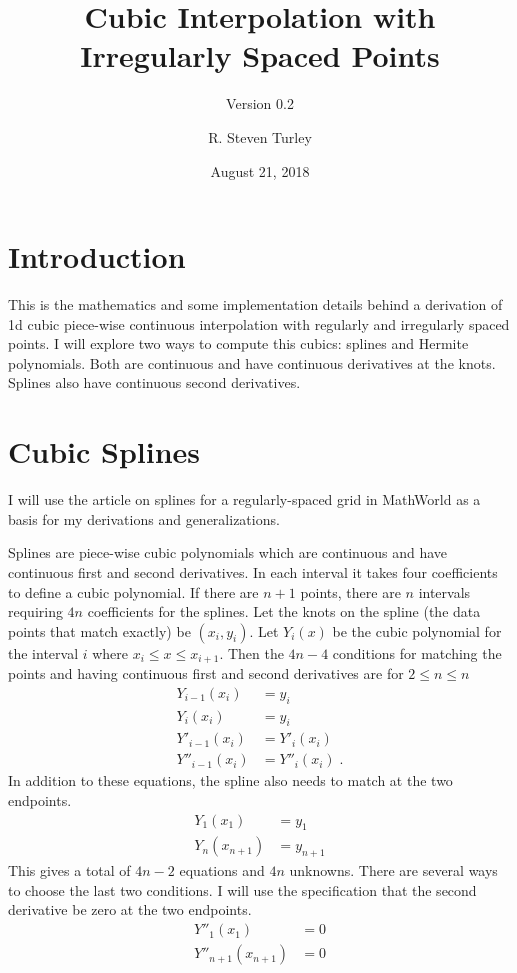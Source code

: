 \documentclass{scrartcl}
\title{Cubic Interpolation with Irregularly Spaced Points}
\subtitle{Version 0.2}
\author{R. Steven Turley}
\date{August 21, 2018}
\begin{document}
\maketitle
\tableofcontents

\section{Introduction}
This is the mathematics and some implementation details
behind a derivation of 1d cubic piece-wise continuous
interpolation with regularly and irregularly spaced points.
I will explore two ways to compute this cubics: splines and
Hermite polynomials. Both are continuous and have continuous
derivatives at the knots. Splines also have continuous second
derivatives.

\section{Cubic Splines}

I will use the article on splines for a regularly-spaced
grid in MathWorld\cite{mathworld} as a basis for my
derivations and generalizations.

Splines are piece-wise cubic polynomials which are continuous
and have continuous first and second derivatives. In each interval
it takes four coefficients to define a cubic polynomial. If there
are $n+1$ points, there are $n$ intervals requiring $4n$ coefficients
for the splines. Let the knots on the spline (the data points that
match exactly) be $(x_i,y_i)$. Let $Y_i(x)$ be the cubic polynomial for
the interval $i$ where $x_i\leq x\leq x_{i+1}$. Then the $4n-4$ conditions
for matching the points and having continuous first and second derivatives
are for $2\leq n \leq n$
\begin{align}
Y_{i-1}(x_i) &= y_i \label{eq:cbegin} \\
Y_i(x_i) &= y_i\\
Y'_{i-1}(x_i) &= Y'_i(x_i)\\
Y''_{i-1}(x_i) &= Y''_i(x_i)\;. \label{eq:c2}
\end{align}
In addition to these equations, the spline also needs to match
at the two endpoints.
\begin{align}
Y_1(x_1) &= y_1\\
Y_n(x_{n+1}) &= y_{n+1}
\end{align}
This gives a total of $4n-2$ equations and $4n$ unknowns. There
are several ways to choose the last two conditions. I will use the
specification that the second derivative be zero at the two endpoints.
\begin{align}
Y''_1(x_1) &= 0 \label{eq:bslope}\\
Y''_{n+1}(x_{n+1}) &= 0 \label{eq:eslope}
\end{align}
\end{document}
